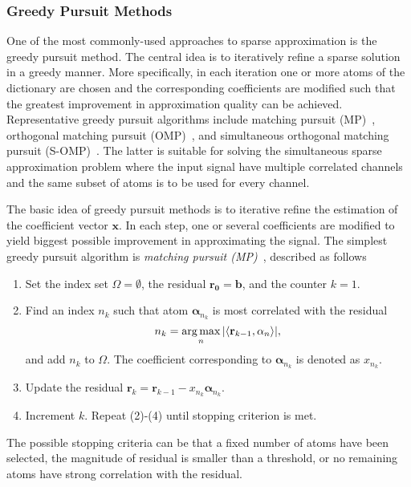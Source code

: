 \subsubsection*{Greedy Pursuit Methods}
One of the most commonly-used approaches to sparse approximation is
the greedy pursuit method. The central idea is to iteratively refine a
sparse solution in a greedy manner. More specifically, in each
iteration one or more atoms of the dictionary are chosen
and the corresponding coefficients are modified
such that the greatest improvement in approximation quality can be achieved.
Representative greedy pursuit algorithms include matching pursuit
(MP)~\cite{Mallat1993}, orthogonal matching pursuit
(OMP)~\cite{Pati1993}, and simultaneous orthogonal matching pursuit (S-OMP)~\cite{Tropp2006a}.
The latter is suitable for solving the simultaneous sparse approximation problem where
the input signal have multiple correlated channels and the same subset of atoms is to be used
for every channel.


The basic idea of greedy pursuit methods is to iterative refine the estimation of the coefficient vector
$\mathbf{x}$. In each step, one or several coefficients are modified to yield biggest possible improvement
in approximating the signal. The simplest greedy pursuit algorithm is \emph{matching pursuit (MP)}~\cite{Mallat1993},
described as follows
\begin{enumerate}
\item Set the index set $\Omega=\emptyset$, the residual $\mathbf{r_0} = \mathbf{b}$, and the counter $k=1$.
\item Find an index $n_k$ such that atom $\mathbf{\alpha}_{n_k}$ is most correlated with the residual
\begin{equation*}
n_k = \operatorname*{arg\,max}_n |\langle \mathbf{r}_{k-1},\mathbf{\alpha}_{n} \rangle|,
\end{equation*}
and add $n_k$ to $\Omega$. The coefficient corresponding to $\mathbf{\alpha}_{n_k}$ is denoted as $x_{n_k}$.

\item Update the residual $\mathbf{r}_k = \mathbf{r}_{k-1} - x_{n_k} \mathbf{\alpha}_{n_k}$.
\item Increment $k$. Repeat (2)-(4) until stopping criterion is met.
\end{enumerate}

The possible stopping criteria can be that a fixed number of atoms have been selected, the magnitude of residual is
smaller than a threshold, or no remaining atoms have strong correlation with the residual.

